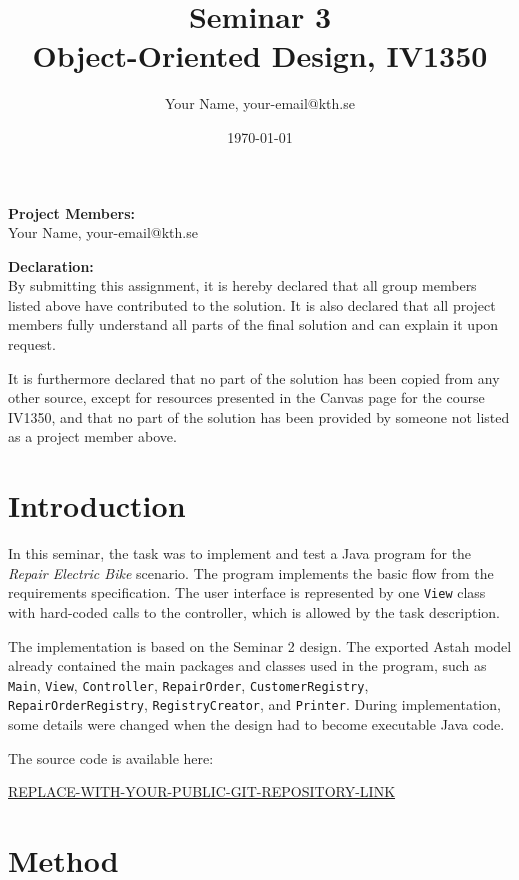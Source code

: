 \documentclass[12pt]{article}
\title{Seminar 3\\Object-Oriented Design, IV1350}
\author{Your Name, your-email@kth.se}
\date{\today}
\begin{document}
\maketitle

\noindent \textbf{Project Members:}\\
Your Name, your-email@kth.se

\vspace{1em}

\noindent \textbf{Declaration:}\\
By submitting this assignment, it is hereby declared that all group members listed above have contributed to the solution. It is also declared that all project members fully understand all parts of the final solution and can explain it upon request.

It is furthermore declared that no part of the solution has been copied from any other source, except for resources presented in the Canvas page for the course IV1350, and that no part of the solution has been provided by someone not listed as a project member above.

\section{Introduction}

In this seminar, the task was to implement and test a Java program for the \emph{Repair Electric Bike} scenario. The program implements the basic flow from the requirements specification. The user interface is represented by one \texttt{View} class with hard-coded calls to the controller, which is allowed by the task description.

The implementation is based on the Seminar 2 design. The exported Astah model already contained the main packages and classes used in the program, such as \texttt{Main}, \texttt{View}, \texttt{Controller}, \texttt{RepairOrder}, \texttt{CustomerRegistry}, \texttt{RepairOrderRegistry}, \texttt{RegistryCreator}, and \texttt{Printer}. During implementation, some details were changed when the design had to become executable Java code.

The source code is available here:
\begin{center}
\url{REPLACE-WITH-YOUR-PUBLIC-GIT-REPOSITORY-LINK}
\end{center}

\newpage
\section{Method}
\end{document}
